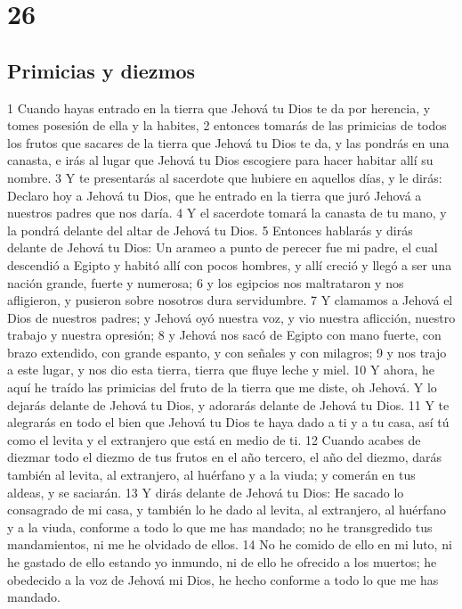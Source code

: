 \chapter{26}


\section{Primicias y diezmos}


1 Cuando hayas entrado en la tierra que Jehová tu Dios te da por herencia, y tomes posesión de ella y la habites,
2 entonces tomarás de las primicias de todos los frutos que sacares de la tierra que Jehová tu Dios te da, y las pondrás en una canasta, e irás al lugar que Jehová tu Dios escogiere para hacer habitar allí su nombre.
3 Y te presentarás al sacerdote que hubiere en aquellos días, y le dirás: Declaro hoy a Jehová tu Dios, que he entrado en la tierra que juró Jehová a nuestros padres que nos daría.
4 Y el sacerdote tomará la canasta de tu mano, y la pondrá delante del altar de Jehová tu Dios.
5 Entonces hablarás y dirás delante de Jehová tu Dios: Un arameo a punto de perecer fue mi padre, el cual descendió a Egipto y habitó allí con pocos hombres, y allí creció y llegó a ser una nación grande, fuerte y numerosa;
6 y los egipcios nos maltrataron y nos afligieron, y pusieron sobre nosotros dura servidumbre.
7 Y clamamos a Jehová el Dios de nuestros padres; y Jehová oyó nuestra voz, y vio nuestra aflicción, nuestro trabajo y nuestra opresión;
8 y Jehová nos sacó de Egipto con mano fuerte, con brazo extendido, con grande espanto, y con señales y con milagros;
9 y nos trajo a este lugar, y nos dio esta tierra, tierra que fluye leche y miel.
10 Y ahora, he aquí he traído las primicias del fruto de la tierra que me diste, oh Jehová. Y lo dejarás delante de Jehová tu Dios, y adorarás delante de Jehová tu Dios.
11 Y te alegrarás en todo el bien que Jehová tu Dios te haya dado a ti y a tu casa, así tú como el levita y el extranjero que está en medio de ti.
12 Cuando acabes de diezmar todo el diezmo de tus frutos en el año tercero, el año del diezmo, darás también al levita, al extranjero, al huérfano y a la viuda; y comerán en tus aldeas, y se saciarán. 
13 Y dirás delante de Jehová tu Dios: He sacado lo consagrado de mi casa, y también lo he dado al levita, al extranjero, al huérfano y a la viuda, conforme a todo lo que me has mandado; no he transgredido tus mandamientos, ni me he olvidado de ellos.
14 No he comido de ello en mi luto, ni he gastado de ello estando yo inmundo, ni de ello he ofrecido a los muertos; he obedecido a la voz de Jehová mi Dios, he hecho conforme a todo lo que me has mandado.
